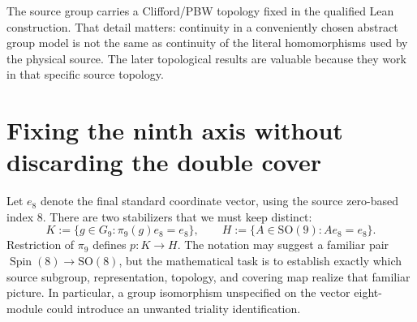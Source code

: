 The source group carries a Clifford/PBW topology fixed in the qualified
Lean construction. That detail matters: continuity in a conveniently
chosen abstract group model is not the same as continuity of the literal
homomorphisms used by the physical source. The later topological results
are valuable because they work in that specific source topology.

\section{Fixing the ninth axis without discarding the double cover}
Let $e_8$ denote the final standard coordinate vector, using the source
zero-based index $8$. There are two stabilizers that we must keep distinct:
\begin{equation}\label{eq:two-stabilizers}
 K:=\{g\in G_9:\pi_9(g)e_8=e_8\},\qquad
 H:=\{A\in\mathrm{SO}(9):Ae_8=e_8\}.
\end{equation}
Restriction of $\pi_9$ defines $p:K\to H$. The notation may suggest
a familiar pair $\operatorname{Spin}(8)\to\mathrm{SO}(8)$, but the
mathematical task is to establish exactly which source subgroup,
representation, topology, and covering map realize that familiar picture.
In particular, a group isomorphism unspecified on the vector eight-module
could introduce an unwanted triality identification.

